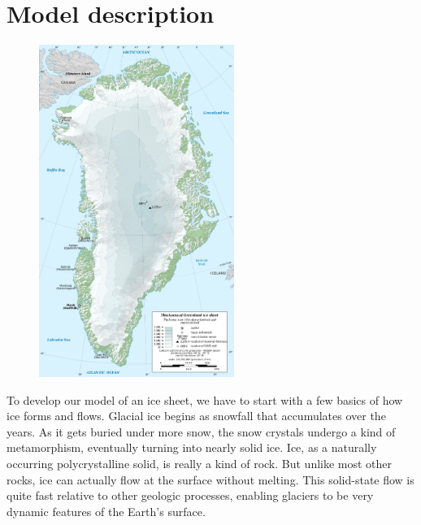 \documentclass[11pt,letterpaper]{article}
\begin{document}
\section{Model description}
\begin{figure}
\includegraphics[width=2.5in]{./greenland.png}
\end{figure}
To develop our model of an ice sheet, we have to start with a few basics of how ice forms and flows. Glacial ice begins as snowfall that accumulates over the years. As it gets buried under more snow, the snow crystals undergo a kind of metamorphism, eventually turning into nearly solid ice. Ice, as a naturally occurring polycrystalline solid, is really a kind of rock. But unlike most other rocks, ice can actually flow at the surface without melting. This solid-state flow is quite fast relative to other geologic processes, enabling glaciers to be very dynamic features of the Earth's surface.
\end{document}
